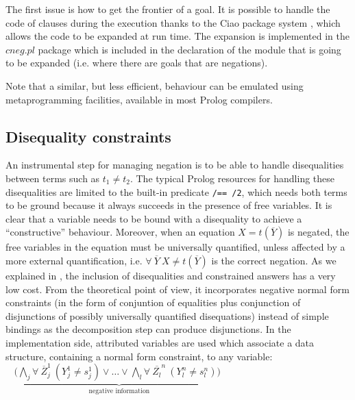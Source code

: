 \documentclass{llncs}
\begin{document}
The first issue is how to get the frontier of a goal. It is possible
to handle the code of clauses during the execution thanks to the Ciao
package system \cite{ciao-modules-cl2000}, which allows the code to be
expanded at run time. The expansion is implemented in the $cneg.pl$
package which is included in the declaration of the module that is
going to be expanded (i.e. where there are goals that are negations).



Note that a similar, but less efficient, behaviour can be emulated
using metaprogramming facilities, available in most Prolog compilers.
 


\subsection{Disequality constraints}
\label{disequality}

An instrumental step for managing negation is to be able to handle
disequalities between terms such as $t_1 \neq t_2$.  The typical
Prolog resources for handling these disequalities are limited to the
built-in predicate {\tt /== /2}, which needs both terms to be ground
because it always succeeds in the presence of free variables.  It is
clear that a variable needs to be bound with a disequality to achieve
a ``constructive'' behaviour.  Moreover, when an equation $X =
t(\overline{Y})$ is negated, the free variables in the equation must
be universally quantified, unless affected by a more external
quantification, i.e. $\forall~ \overline{Y}~X \neq t(\overline{Y})$ is
the correct negation.  As we explained in \cite{SusanaPADL2000}, the
inclusion of disequalities and constrained answers has a very low
cost. From the theoretical point of view, it incorporates negative normal form 
constraints (in the form of conjuntion of equalities plus conjunction of 
disjunctions of possibly universally quantified
disequations) instead of simple bindings as the decomposition step can produce 
disjunctions. In the implementation side, attributed variables are used 
which associate a data structure, containing a
normal form constraint, to any variable: $~~~~( \underbrace{\bigwedge_j \forall~ \overline{Z}_j^1~(Y_j^1 \neq s_j^1) 
\vee \ldots \vee \bigwedge_l \forall~ \overline{Z_l}^n~(Y_l^n \neq s_l^n) ) }_{\mbox{negative information}} $
\end{document}
